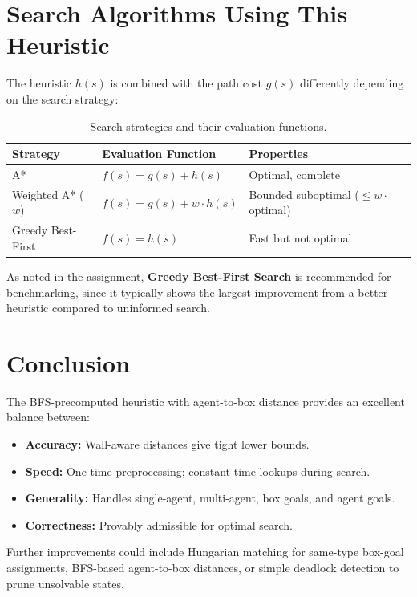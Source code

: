 \documentclass[11pt, a4paper]{article}
\begin{document}
\section{Search Algorithms Using This Heuristic}

The heuristic $h(s)$ is combined with the path cost $g(s)$ differently depending on the search strategy:

\begin{table}[h!]
\centering
\renewcommand{\arraystretch}{1.4}
\begin{tabular}{@{}lll@{}}
\toprule
\textbf{Strategy} & \textbf{Evaluation Function} & \textbf{Properties} \\
\midrule
A*               & $f(s) = g(s) + h(s)$        & Optimal, complete \\
Weighted A* ($w$) & $f(s) = g(s) + w \cdot h(s)$ & Bounded suboptimal ($\leq w \cdot$ optimal) \\
Greedy Best-First & $f(s) = h(s)$               & Fast but not optimal \\
\bottomrule
\end{tabular}
\caption{Search strategies and their evaluation functions.}
\end{table}

As noted in the assignment, \textbf{Greedy Best-First Search} is recommended for benchmarking, since it typically shows the largest improvement from a better heuristic compared to uninformed search.

\section{Conclusion}

The BFS-precomputed heuristic with agent-to-box distance provides an excellent balance between:
\begin{itemize}[leftmargin=1.5em]
    \item \textbf{Accuracy:} Wall-aware distances give tight lower bounds.
    \item \textbf{Speed:} One-time preprocessing; constant-time lookups during search.
    \item \textbf{Generality:} Handles single-agent, multi-agent, box goals, and agent goals.
    \item \textbf{Correctness:} Provably admissible for optimal search.
\end{itemize}

Further improvements could include Hungarian matching for same-type box-goal assignments, BFS-based agent-to-box distances, or simple deadlock detection to prune unsolvable states.
\end{document}
